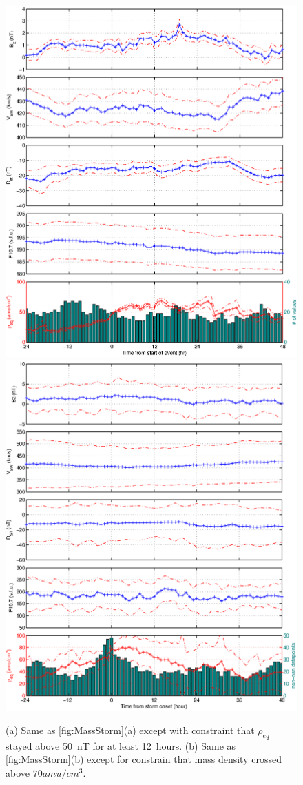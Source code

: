 \documentclass[10pt,twocolumn]{article}
\begin{document}
\begin{figure}[htp!]
\centering
\includegraphics[scale=0.5]{paperfigures/stormavs-md12.eps}
\includegraphics[scale=0.5]{paperfigures/stormavs-m70.eps}
\caption{(a) Same as \ref{fig:MassStorm}(a) except with constraint that $\rho_{eq}$ stayed above 50~nT for at least 12~hours. (b) Same as \ref{fig:MassStorm}(b) except for constrain that mass density crossed above $70 amu/cm^3$.}
\label{Dspec}
\end{figure}
\end{document}
